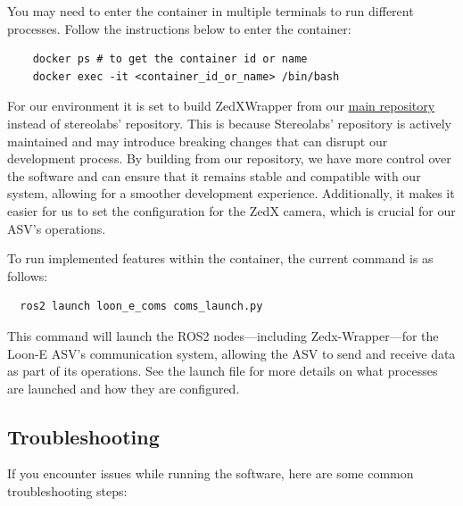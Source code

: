 
You may need to enter the container in multiple terminals to run different processes. 
Follow the instructions below to enter the container:

\begin{verbatim}
    docker ps # to get the container id or name
    docker exec -it <container_id_or_name> /bin/bash
\end{verbatim}

For our environment it is set to build ZedXWrapper from our \href{https://github.com/HumberASV/zed-ros2-wrapper}{main repository} instead of stereolabs' repository.
This is because Stereolabs' repository is actively maintained and may introduce breaking changes that can disrupt our development process.
By building from our repository, we have more control over the software and can ensure that it remains stable and compatible with our system, allowing for a smoother development experience.
Additionally, it makes it easier for us to set the configuration for the ZedX camera, which is crucial for our ASV's operations.

To run implemented features within the container, the current command is as follows:
\begin{verbatim}
  ros2 launch loon_e_coms coms_launch.py
\end{verbatim}

This command will launch the ROS2 nodes---including Zedx-Wrapper---for the Loon-E ASV's communication system, allowing the ASV to send and receive data as part of its operations. See the launch file for more details on what processes are launched and how they are configured.


\subsection{Troubleshooting}

If you encounter issues while running the software, here are some common troubleshooting steps:

